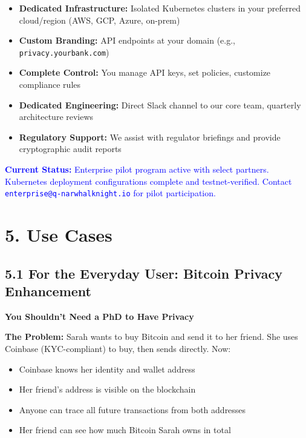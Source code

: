\documentclass[11pt,a4paper]{article}
\begin{document}
\begin{itemize}
    \item \textbf{Dedicated Infrastructure:} Isolated Kubernetes clusters in your preferred cloud/region (AWS, GCP, Azure, on-prem)

    \item \textbf{Custom Branding:} API endpoints at your domain (e.g., \texttt{privacy.yourbank.com})

    \item \textbf{Complete Control:} You manage API keys, set policies, customize compliance rules

    \item \textbf{Dedicated Engineering:} Direct Slack channel to our core team, quarterly architecture reviews

    \item \textbf{Regulatory Support:} We assist with regulator briefings and provide cryptographic audit reports
\end{itemize}

\textcolor{blue}{\textbf{Current Status:} Enterprise pilot program active with select partners. Kubernetes deployment configurations complete and testnet-verified. Contact \texttt{enterprise@q-narwhalknight.io} for pilot participation.}

\section{5. Use Cases}

\subsection{5.1 For the Everyday User: Bitcoin Privacy Enhancement}

\textbf{You Shouldn't Need a PhD to Have Privacy}

\textbf{The Problem:} Sarah wants to buy Bitcoin and send it to her friend. She uses Coinbase (KYC-compliant) to buy, then sends directly. Now:
\begin{itemize}
    \item Coinbase knows her identity and wallet address
    \item Her friend's address is visible on the blockchain
    \item Anyone can trace all future transactions from both addresses
    \item Her friend can see how much Bitcoin Sarah owns in total
\end{itemize}
\end{document}
